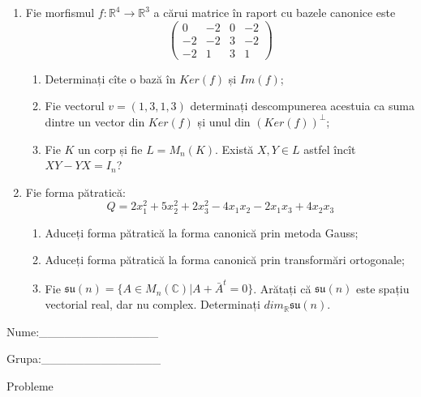 \documentclass{article}
\begin{document}
\begin{enumerate}
 \item Fie morfismul $f:\mathbb{R}^4 \to \mathbb{R}^3$ a cărui matrice în raport cu bazele canonice este
$$\begin{pmatrix}
0&-2&0&-2\\
-2&-2&3&-2\\
-2&1&3&1
\end{pmatrix}$$

\begin{enumerate}
\item Determinați cîte o bază în $Ker(f)$ și $Im(f)$;
\item Fie vectorul $v=(1,3,1,3)$ determinați descompunerea acestuia ca suma dintre un vector din $Ker(f)$ și unul din $(Ker(f))^\perp$;
\item Fie $K$ un corp și fie $L=M_n(K)$. Există $X,Y \in L$ astfel încît $XY-YX=I_n$?  
\end{enumerate}
\item Fie forma pătratică:
$$Q= 2x_1^2+5x_2^2+2x_3^2-4x_1x_2-2x_1x_3+4x_2x_3$$

\begin{enumerate}
\item Aduceți forma pătratică la forma canonică prin metoda Gauss;
\item Aduceți forma pătratică la forma canonică prin transformări ortogonale;
\item Fie $\mathfrak{su}(n)=\{ A \in M_n(\mathbb{C}) | A+\bar{A}^t=0\}$. Arătați că $\mathfrak{su}(n)$ este spațiu vectorial real, dar nu complex.
Determinați $dim_{\mathbb{R}}\mathfrak{su}(n)$.
\end{enumerate}
\end{enumerate}
\newpage
\begin{flushright}
Nume:\_\_\_\_\_\_\_\_\_\_\_\_\_\_
 
 
Grupa:\_\_\_\_\_\_\_\_\_\_\_\_\_\_
\end{flushright}
\begin{center}
\vspace{2cm}
{\Large Probleme}
\vspace{2cm}
\end{center}
\end{document}
